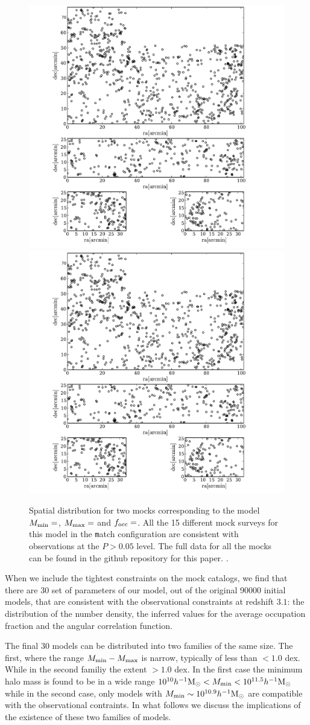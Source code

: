 \documentclass[usenatbib]{mn2e}
\newcommand{\hMsun}{{\ifmmode{h^{-1}{\rm {M_{\odot}}}}\else{$h^{-1}{\rm{M_{\odot}}}$}\fi}}
\begin{document}
\begin{figure}
\begin{center}
\includegraphics[width=0.49\linewidth,angle=0]{./plots/mytest.pdf}
\includegraphics[width=0.49\linewidth,angle=0]{./plots/mytest.pdf}
\end{center} 
\caption{Spatial distribution for two mocks corresponding to the model
  $M_{\rm min}=$, $M_{\rm max}=$ and $f_{\rm occ}=$. All the 15
  different mock  surveys for this model in the {\texttt match}
  configuration are consistent with observations at the $P>0.05$
  level. The full data for all the mocks can be found in the github
  repository for this paper.
  \label{figure:spatial_distro}.}
\end{figure}


When we include the tightest constraints on the mock catalogs, we find
that there are 30 set of parameters of our model, out of the original
90000 initial models, that are consistent with the observational
constraints at redshift $3.1$: the distribution of the number density,
the inferred values for the average occupation fraction and the
angular correlation function.

The final 30 models can be distributed into two families of the same
size. The first, where the range $M_{\rm min}-M_{\rm max}$ is narrow,
typically of less than $<1.0$ dex. While in the second familiy the
extent $>1.0$ dex. In the first case the minimum halo mass is found to
be in a wide range $10^{10}\hMsun <M_{\rm min}< 10^{11.5}\hMsun$ while
in the second case, only models with $M_{\rm min}\sim 10^{10.9}\hMsun$
are compatible with the observational contraints. In what follows we
discuss the implications of the existence of these two families of
models.  
\end{document}
